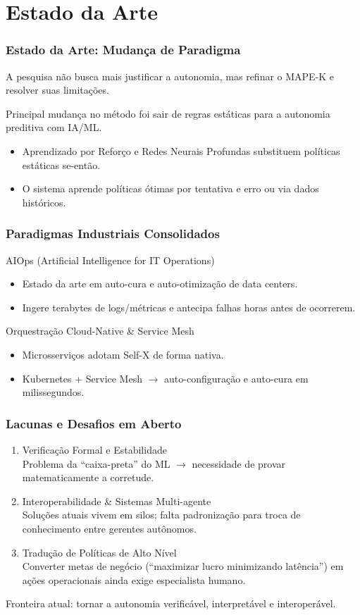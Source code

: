 \documentclass{beamer}
\begin{document}
  \section{Estado da Arte}

  \begin{frame}
    \frametitle{Estado da Arte: Mudança de Paradigma}
    A pesquisa não busca mais justificar a autonomia, mas refinar o MAPE-K e resolver suas limitações.

    Principal mudança no método foi sair de regras estáticas para a autonomia preditiva com IA/ML.
    \begin{itemize}
      \item Aprendizado por Reforço e Redes Neurais Profundas substituem políticas estáticas se-então.
      \item O sistema aprende políticas ótimas por tentativa e erro ou via dados históricos.
    \end{itemize}
  \end{frame}

  \begin{frame}
    \frametitle{Paradigmas Industriais Consolidados}
    AIOps (Artificial Intelligence for IT Operations)
    \begin{itemize}
      \item Estado da arte em auto-cura e auto-otimização de data centers.
      \item Ingere terabytes de logs/métricas e antecipa falhas horas antes de ocorrerem.
    \end{itemize}
    Orquestração Cloud-Native \& Service Mesh
    \begin{itemize}
      \item Microsserviços adotam Self-X de forma nativa.
      \item Kubernetes + Service Mesh $\rightarrow$ auto-configuração e auto-cura em milissegundos.
    \end{itemize}
  \end{frame}

  \begin{frame}
    \frametitle{Lacunas e Desafios em Aberto}
    \begin{enumerate}
      \item Verificação Formal e Estabilidade\\
      Problema da ``caixa-preta'' do ML $\rightarrow$ necessidade de provar matematicamente a corretude.

      \item Interoperabilidade \& Sistemas Multi-agente\\
      Soluções atuais vivem em silos; falta padronização para troca de conhecimento entre gerentes autônomos.

      \item Tradução de Políticas de Alto Nível\\
      Converter metas de negócio (``maximizar lucro minimizando latência'') em ações operacionais ainda exige especialista humano.
    \end{enumerate}

    Fronteira atual: tornar a autonomia verificável, interpretável e interoperável.
  \end{frame}
\end{document}
